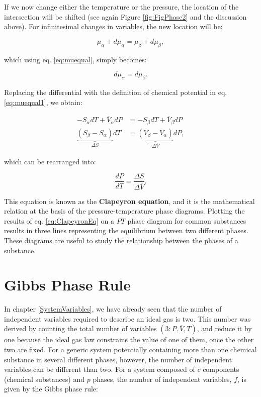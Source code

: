 \documentclass[
  9pt,
]{extbook}
\theoremstyle{definition}
\theoremstyle{definition}
\theoremstyle{definition}
\theoremstyle{definition}
\theoremstyle{remark}
\begin{document}
If we now change either the temperature or the pressure, the location of the intersection will be shifted (see again Figure \ref{fig:FigPhase2} and the discussion above). For infinitesimal changes in variables, the new location will be:

\begin{equation}
\mu_{\alpha} + d\mu_{\alpha}= \mu_{\beta}+d\mu_{\beta},
\label{eq:muequalA}
\end{equation}

which using eq. \eqref{eq:muequal}, simply becomes:

\begin{equation}
d\mu_{\alpha}= d\mu_{\beta}.
\label{eq:muequalB}
\end{equation}

Replacing the differential with the definition of chemical potential in eq. \eqref{eq:muequal1}, we obtain:

\begin{equation}
\begin{aligned}
-S_{\alpha}dT+\overline{V}_{\alpha}dP &= -S_{\beta}dT+\overline{V}_{\beta}dP \\
\underbrace{\left(S_{\beta}-S_{\alpha}\right)}_{\Delta S} dT &= \underbrace{\left( \overline{V}_{\beta}-\overline{V}_{\alpha}\right)}_{\Delta \overline{V}}dP,
\end{aligned}
\label{eq:muequalC}
\end{equation}

which can be rearranged into:

\begin{equation}
\frac{dP}{dT}=\frac{\Delta S}{\Delta \overline{V}}.
\label{eq:ClapeyronEq}
\end{equation}

This equation is known as the \textbf{Clapeyron equation}, and it is the mathematical relation at the basis of the pressure-temperature phase diagrams. Plotting the results of eq. \eqref{eq:ClapeyronEq} on a \(PT\) phase diagram for common substances results in three lines representing the equilibrium between two different phases. These diagrams are useful to study the relationship between the phases of a substance.

\section{Gibbs Phase Rule}\label{gibbs-phase-rule}

In chapter \ref{SystemVariables}, we have already seen that the number of independent variables required to describe an ideal gas is two. This number was derived by counting the total number of variables \((3: P,\overline{V},T)\), and reduce it by one because the ideal gas law constrains the value of one of them, once the other two are fixed. For a generic system potentially containing more than one chemical substance in several different phases, however, the number of independent variables can be different than two. For a system composed of \(c\) components (chemical substances) and \(p\) phases, the number of independent variables, \(f\), is given by the Gibbs phase rule:
\end{document}
